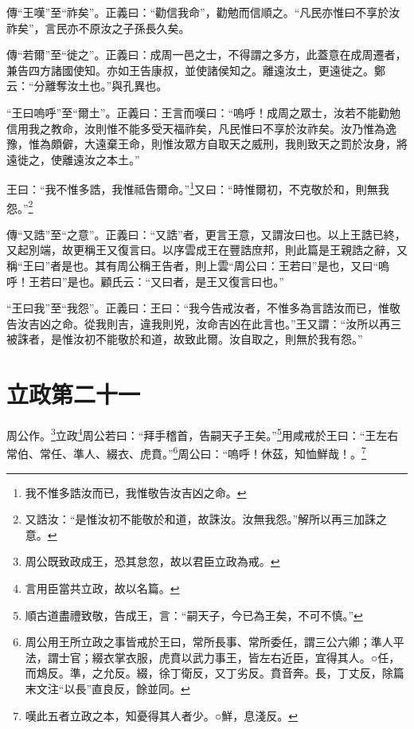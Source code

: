 {\noindent\zhuan{}\fzbyks 傳“王嘆”至“祚矣”。正義曰：“勸信我命”，勸勉而信順之。“凡民亦惟曰不享於汝祚矣”，言民亦不原汝之子孫長久矣。 \par}

{\noindent\zhuan{}\fzbyks 傳“若爾”至“徙之”。正義曰：成周一邑之士，不得謂之多方，此蓋意在成周遷者，兼告四方諸國使知。亦如王告康叔，並使諸侯知之。離遠汝土，更遠徙之。鄭云：“分離奪汝土也。”與孔異也。 \par}

{\noindent\shu{}\fzkt “王曰嗚呼”至“爾土”。正義曰：王言而嘆曰：“嗚呼！成周之眾士，汝若不能勸勉信用我之教命，汝則惟不能多受天福祚矣，凡民惟曰不享於汝祚矣。汝乃惟為逸豫，惟為頗僻，大遠棄王命，則惟汝眾方自取天之威刑，我則致天之罰於汝身，將遠徙之，使離遠汝之本土。” \par}

王曰：“我不惟多誥，我惟祗告爾命。”\footnote{我不惟多誥汝而已，我惟敬告汝吉凶之命。}又曰：“時惟爾初，不克敬於和，則無我怨。”\footnote{又誥汝：“是惟汝初不能敬於和道，故誅汝。汝無我怨。”解所以再三加誅之意。}


{\noindent\zhuan{}\fzbyks 傳“又誥”至“之意”。正義曰：“又誥”者，更言王意，又謂汝曰也。以上王誥已終，又起別端，故更稱王又復言曰。以序雲成王在豐誥庶邦，則此篇是王親誥之辭，又稱“王曰”者是也。其有周公稱王告者，則上雲“周公曰：王若曰”是也，又曰“嗚呼！王若曰”是也。顧氏云：“又曰者，是王又復言曰也。” \par}

{\noindent\shu{}\fzkt “王曰我”至“我怨”。正義曰：王曰：“我今告戒汝者，不惟多為言誥汝而已，惟敬告汝吉凶之命。從我則吉，違我則兇，汝命吉凶在此言也。”王又謂：“汝所以再三被誅者，是惟汝初不能敬於和道，故致此爾。汝自取之，則無於我有怨。” \par}

\section{立政第二十一}


周公作。\footnote{周公既致政成王，恐其怠忽，故以君臣立政為戒。}立政\footnote{言用臣當共立政，故以名篇。}周公若曰：“拜手稽首，告嗣天子王矣。”\footnote{順古道盡禮致敬，告成王，言：“嗣天子，今已為王矣，不可不慎。”}用咸戒於王曰：“王左右常伯、常任、準人、綴衣、虎賁。”\footnote{周公用王所立政之事皆戒於王曰，常所長事、常所委任，謂三公六卿；準人平法，謂士官；綴衣掌衣服，虎賁以武力事王，皆左右近臣，宜得其人。○任，而鴆反。準，之允反。綴，徐丁衛反，又丁劣反。賁音奔。長，丁丈反，除篇末文注“以長”直良反，餘並同。}周公曰：“嗚呼！休茲，知恤鮮哉！。\footnote{嘆此五者立政之本，知憂得其人者少。○鮮，息淺反。}


